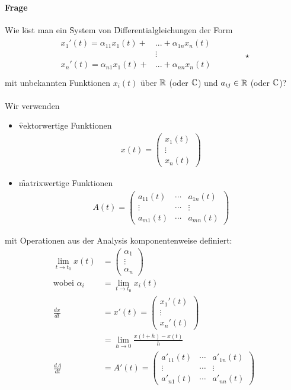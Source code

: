 \paragraph{Frage}
Wie löst man ein \f{System} von \f{Differentialgleichungen} der Form
\begin{align}
\begin{matrix}
x_{1}'(t) = \alpha_{11} x_1(t) + &... + \alpha_{1n} x_n (t) \\
&\vdots \\
x_{n}'(t) = \alpha_{n1} x_1(t) + &... + \alpha_{nn} x_n (t) \\ 
\end{matrix} \phantom{mmmm} \star
\end{align}
mit unbekannten Funktionen $x_i(t)$ über $\mathbb{R}$ (oder $\mathbb{C}$) und $a_{ij} \in \mathbb{R}$ (oder $\mathbb{C}$)? \\\\
Wir verwenden
\begin{itemize}
\item \f{vektorwertige Funktionen}
\begin{align}
x(t) = \begin{pmatrix} x_1(t) \\ \vdots \\ x_n(t)\end{pmatrix}
\end{align}
\item \f{matrixwertige Funktionen}
\begin{align}
A(t) = \begin{pmatrix} a_{11}(t) & \cdots & a_{1n}(t) \\ \vdots & \cdots & \vdots \\ a_{m1}(t) & \cdots & a_{mn}(t) \end{pmatrix}
\end{align}
\end{itemize}
mit Operationen aus der Analysis komponentenweise definiert:
\begin{align}
\lim_{t \rightarrow t_0} x(t) &= \begin{pmatrix} \alpha_1 \\ \vdots \\ \alpha_n\end{pmatrix} \\
\text{wobei } \alpha_i &= \lim_{t \rightarrow t_0} x_i(t) \\
\frac{dx}{dt} &= x'(t) = \begin{pmatrix} x_1'(t) \\ \vdots \\ x_n'(t) \end{pmatrix} \\
&= \lim_{h \rightarrow 0} \frac{x(t+h) - x(t)}{h} \\
\frac{dA}{dt} &= A'(t) = \begin{pmatrix} a'_{11}(t) & \cdots & a'_{1n}(t) \\ \vdots & \cdots & \vdots \\ a'_{n1}(t) & \cdots & a'_{nn}(t) \end{pmatrix}
\end{align}
